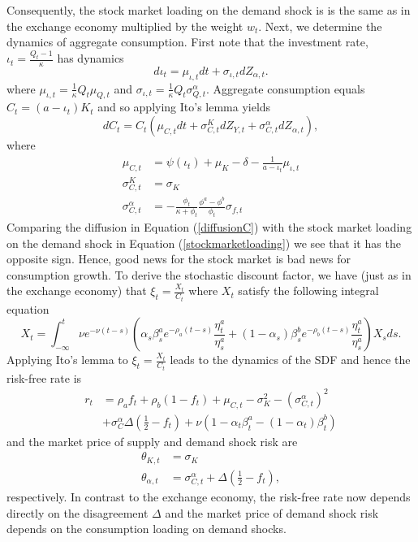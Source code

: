 Consequently,  the stock market loading on the demand shock is is the same as in the exchange economy multiplied by the weight $w_t$. Next, we determine the dynamics of aggregate consumption. First note that the investment rate, $\iota_t = \frac{Q_t-1}{\kappa}$ has dynamics
\begin{equation}
	d\iota_t = \mu_{\iota,t}dt + \sigma_{\iota,t}dZ_{\alpha,t}.
\end{equation}
where $ \mu_{\iota,t} = \frac{1}{\kappa}Q_t\mu_{Q,t}$ and $\sigma_{\iota,t} = \frac{1}{\kappa}Q_t \sigma^{\alpha}_{Q,t}$. Aggregate consumption equals  $C_t = \left(a-\iota_t\right)K_t$ and so applying Ito's lemma yields
\begin{equation}
	dC_t = C_t \left(\mu_{C,t}dt + \sigma^{K}_{C,t}dZ_{Y,t} + \sigma^{\alpha}_{C,t}dZ_{\alpha,t}\right),
\end{equation}
where 
\begin{align}
	\mu_{C,t} &=   \psi \left(\iota_t\right) + \mu_K-\delta - \frac{1}{a-\iota_t}\mu_{\iota,t} \\
	\sigma^{K}_{C,t} &= \sigma_K \\
	 \sigma^{\alpha}_{C,t} &=  -\frac{\phi_t}{\kappa+\phi_t} \frac{\phi^a-\phi^b}{\phi_t}\sigma_{f,t}  \label{diffusionC}
\end{align}
Comparing the diffusion in Equation (\ref{diffusionC}) with the stock market loading on the demand shock in Equation (\ref{stockmarketloading}) we see that it has the opposite sign. Hence, good news for the stock market is bad news for consumption growth. To derive the stochastic discount factor, we have (just as in the exchange economy) that $\xi_t = \frac{X_t}{C_t}$ where $X_t$ satisfy the following integral equation
\begin{equation}
	X_t = \int_{-\infty}^{t}\nu e^{-\nu\left(t-s\right)}\left(\alpha_s \beta^a_s e^{-\rho_a \left(t-s\right)}\frac{\eta^a_t}{\eta^a_s}+(1-\alpha_s) \beta^b_s e^{-\rho_b \left(t-s\right)}\frac{\eta^a_t}{\eta^a_s}\right)X_s ds.
\end{equation}
Applying Ito's lemma to $\xi_t = \frac{X_t}{C_t}$ leads to the dynamics of the SDF and hence the risk-free rate is
\begin{align}
	r_t &=  \rho_a f_t + \rho_b \left(1-f_t\right) + \mu_{C,t} - \sigma_{K}^2  - \left(\sigma^{\alpha}_{C,t}\right)^2 \\
	&  + \sigma^{\alpha}_C\Delta\left(\frac{1}{2}-f_t\right)   
	   + \nu\left(1-\alpha_t \beta^a_t - \left(1-\alpha_t\right)\beta^b_t\right) 
\end{align}
and the market price of supply and demand shock risk are
\begin{align}
	\theta_{K,t} &=  \sigma_{K} \\
	\theta_{\alpha,t} &=  \sigma^{\alpha}_{C,t} + \Delta\left(\frac{1}{2}-f_t\right),
\end{align}
respectively. In contrast to the exchange economy, the risk-free rate now depends directly on the disagreement $\Delta$ and the market price of demand shock risk depends on the consumption loading on demand shocks. 

